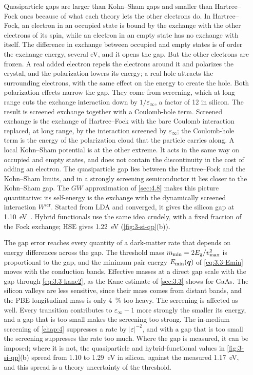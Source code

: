 Quasiparticle gaps are larger than Kohn--Sham gaps and smaller than Hartree--Fock ones because of what each theory lets the other electrons do. In Hartree--Fock, an electron in an occupied state is bound by the exchange with the other electrons of its spin, while an electron in an empty state has no exchange with itself. The difference in exchange between occupied and empty states is of order the exchange energy, several eV, and it opens the gap. But the other electrons are frozen. A real added electron repels the electrons around it and polarizes the crystal, and the polarization lowers its energy; a real hole attracts the surrounding electrons, with the same effect on the energy to create the hole. Both polarization effects narrow the gap. They come from screening, which at long range cuts the exchange interaction down by $1/\varepsilon_\infty$, a factor of 12 in silicon. The result is screened exchange together with a Coulomb-hole term. Screened exchange is the exchange of Hartree--Fock with the bare Coulomb interaction replaced, at long range, by the interaction screened by $\varepsilon_\infty$; the Coulomb-hole term is the energy of the polarization cloud that the particle carries along. A local Kohn--Sham potential is at the other extreme. It acts in the same way on occupied and empty states, and does not contain the discontinuity in the cost of adding an electron. The quasiparticle gap lies between the Hartree--Fock and the Kohn--Sham limits, and in a strongly screening semiconductor it lies closer to the Kohn--Sham gap. The $GW$ approximation of \cref{sec:4.8} makes this picture quantitative: its self-energy is the exchange with the dynamically screened interaction $W^{\mathrm{scr}}$. Started from LDA and converged, it gives the silicon gap at \SI{1.10}{eV}~\cite[Sect.~IV\,C]{klimes2014predictive}. Hybrid functionals use the same idea crudely, with a fixed fraction of the Fock exchange; HSE gives \SI{1.22}{eV} (\cref{fig:3-si-qp}(b)).

The gap error reaches every quantity of a dark-matter rate that depends on energy differences across the gap. The threshold mass $m_{\mathrm{min}} = 2E_{\mathrm{g}}/v_{\mathrm{max}}^2$ is proportional to the gap, and the minimum pair energy $E_{\mathrm{min}}(\bm{q})$ of \cref{eq:3.3-Emin} moves with the conduction bands. Effective masses at a direct gap scale with the gap through \cref{eq:3.3-kane2}, as the Kane estimate of \cref{sec:3.3} shows for GaAs. The silicon valleys are less sensitive, since their mass comes from distant bands, and the PBE longitudinal mass is only \SI{4}{\percent} too heavy. The screening is affected as well. Every transition contributes to $\varepsilon_\infty - 1$ more strongly the smaller its energy, and a gap that is too small makes the screening too strong. The in-medium screening of \cref{chap:4} suppresses a rate by $|\varepsilon|^{-2}$, and with a gap that is too small the screening suppresses the rate too much. Where the gap is measured, it can be imposed; where it is not, the quasiparticle and hybrid-functional values in \cref{fig:3-si-qp}(b) spread from 1.10 to \SI{1.29}{eV} in silicon, against the measured \SI{1.17}{eV}, and this spread is a theory uncertainty of the threshold.

